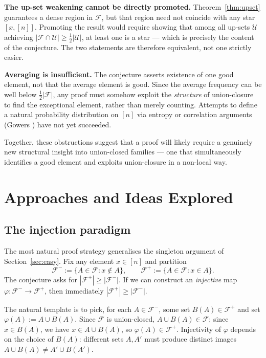 \documentclass[11pt]{article}
\theoremstyle{definition}
\theoremstyle{remark}
\newcommand{\F}{\mathcal{F}}
\newcommand{\U}{\mathcal{U}}
\begin{document}
\textbf{The up-set weakening cannot be directly promoted.}
Theorem~\ref{thm:upset} guarantees a dense region in $\F$,
but that region need not coincide with any star $[x,[n]]$.
Promoting the result would require showing that among all up-sets $\U$
achieving $|\F \cap \U| \ge \frac{1}{2}|\U|$,
at least one is a star --- which is precisely the content of the conjecture.
The two statements are therefore equivalent, not one strictly easier.

\textbf{Averaging is insufficient.}
The conjecture asserts existence of one good element, not that the average
element is good.
Since the average frequency can be well below $\frac{1}{2}|\F|$,
any proof must somehow exploit the \emph{structure} of union-closure
to find the exceptional element, rather than merely counting.
Attempts to define a natural probability distribution on $[n]$ via entropy
or correlation arguments (Gowers \cite{gowers2016}) have not yet succeeded.

Together, these obstructions suggest that a proof will likely require a
genuinely new structural insight into union-closed families --- one that
simultaneously identifies a good element and exploits union-closure in a
non-local way.

\section{Approaches and Ideas Explored}

\subsection{The injection paradigm}

The most natural proof strategy generalises the singleton argument of
Section~\ref{sec:easy}.  Fix any element $x \in [n]$ and partition
\[
  \F^- := \{A \in \F : x \notin A\}, \qquad
  \F^+ := \{A \in \F : x \in A\}.
\]
The conjecture asks for $|\F^+| \ge |\F^-|$.
If we can construct an \emph{injective} map
$\varphi : \F^- \to \F^+$, then immediately $|\F^+| \ge |\F^-|$.

The natural template is to pick, for each $A \in \F^-$, some set
$B(A) \in \F^+$ and set $\varphi(A) := A \cup B(A)$.
Since $\F$ is union-closed, $A \cup B(A) \in \F$; since $x \in B(A)$,
we have $x \in A \cup B(A)$, so $\varphi(A) \in \F^+$.
Injectivity of $\varphi$ depends on the choice of $B(A)$:
different sets $A, A'$ must produce distinct images $A \cup B(A) \neq A' \cup B(A')$.
\end{document}
